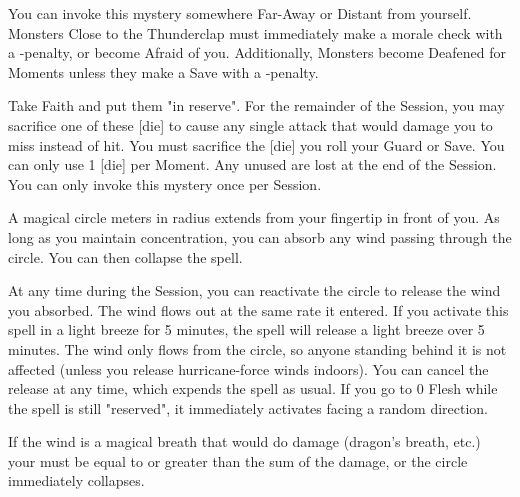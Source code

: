\MYSTERY [
  Name = Thunderclap,
  Link = arcana-mystery-thunderclap,
  Paradigm = Elements,
  Save = Y (neg.),
  Duration = Instant,
  Target = Far-Away or Distant
]

You can invoke this mystery somewhere Far-Away or Distant from yourself.  Monsters Close to the Thunderclap must immediately make a morale check with a -\DICE penalty, or become Afraid of you.  Additionally, Monsters become Deafened for \DICE Moments unless they make a Save with a -\DICE penalty.

\newpage

\MYSTERY [
  Name = Armor of Winds,
  Link = arcana-mystery-armor-of-winds,
  Paradigm = Entropy,
  Save = n/a,
  Duration = Session,
  Target = Self
]

Take \DICE Faith and put them "in reserve".  For the remainder of the Session, you may sacrifice one of these [die] to cause any single  attack that would damage you to miss instead of hit.  You must sacrifice the [die]  you roll your Guard or Save.  You can only use 1 [die] per Moment.  Any unused \DICE are lost at the end of the Session.  You can only invoke this mystery once per Session.

\MYSTERY [
  Name = Capture Wind,
  Link = arcana-mystery-capture-wind,
  Paradigm = Elements,
  Save = N,
  Duration = Concentration or Session,
  Target = See Below
]

A magical circle \DICE meters in radius extends from your fingertip in front of you. As long as you maintain concentration, you can absorb any wind passing through the circle. You can then collapse the spell. 

At any time during the Session, you can reactivate the circle to release the wind you absorbed.  The wind flows out at the same rate it entered. If you activate this spell in a light breeze for 5 minutes, the spell will release a light breeze over 5 minutes. The wind only flows from the circle, so anyone standing behind it is not affected (unless you release hurricane-force winds indoors). You can cancel the release at any time, which expends the spell as usual. If you go to 0 Flesh while the spell is still "reserved", it immediately activates facing a random direction.  

If the wind is a magical breath that would do damage (dragon's breath, etc.) your \SUMDICE must be equal to or greater than the sum of the damage, or the circle immediately collapses.  

